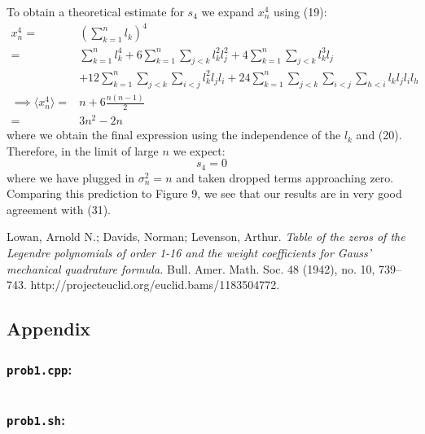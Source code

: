 \documentclass[12pt,letterpaper]{article}
\begin{document}
To obtain a theoretical estimate for $s_4$ we expand $x_n^4$ using (19):
\begin{align}
	x_n^4 =& \left( \sum\limits_{k=1}^{n} l_k \right) ^4 \nonumber \\
		  =& \sum\limits_{k=1}^{n} l_k^4 + 6\sum\limits_{k=1}^{n}\sum\limits_{j<k} l_k^2 l_j^2 + 4\sum\limits_{k=1}^{n}\sum\limits_{j<k} l_k^3 l_j \nonumber \\
		 & + 12\sum\limits_{k=1}^{n}\sum\limits_{j<k}\sum\limits_{i<j} l_k^2 l_j l_i + 24\sum\limits_{k=1}^{n}\sum\limits_{j<k}\sum\limits_{i<j}\sum\limits_{h<i} l_k l_j l_i l_h \nonumber \\
	\implies \langle x_n^4 \rangle =& n + 6\frac{n(n-1)}{2} \nonumber \\
								   =& 3n^2 -2n
\end{align}
where we obtain the final expression using the independence of the $l_k$ and (20). Therefore, in the limit of large $n$ we expect:
\begin{equation}
	s_4 = 0	
\end{equation}
where we have plugged in $\sigma^2_n=n$ and taken dropped terms approaching zero. Comparing this prediction to Figure 9, we see that our results are in very good agreement with (31). 

\clearpage

\begin{thebibliography}{1}

	Lowan, Arnold N.; Davids, Norman; Levenson, Arthur.
	\emph{Table of the zeros of the Legendre polynomials of order 1-16 and the weight coefficients for Gauss' mechanical quadrature formula.}
	Bull. Amer. Math. Soc. 48 (1942), no. 10, 739--743.
	http://projecteuclid.org/euclid.bams/1183504772.

\end{thebibliography}


\clearpage

\subsection*{Appendix}

\subsubsection*{\texttt{prob1.cpp}:}

\inputminted[breaklines=true]{c}{prob1.cpp}

\subsubsection*{\texttt{prob1.sh}:}
\end{document}
